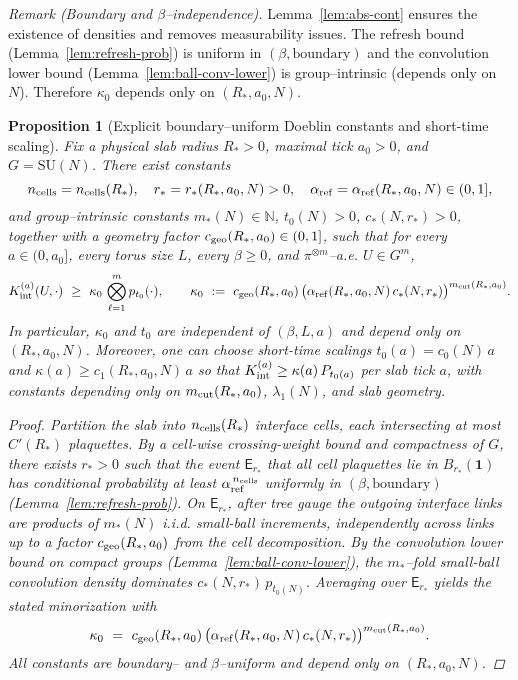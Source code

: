 \documentclass[11pt]{amsart}
\theoremstyle{plain}
\newtheorem{proposition}[theorem]{Proposition}
\theoremstyle{definition}
\theoremstyle{remark}
\begin{document}
\noindent\emph{Remark (Boundary and $\beta$–independence).} Lemma~\ref{lem:abs-cont} ensures the existence of densities and removes measurability issues. The refresh bound (Lemma~\ref{lem:refresh-prob}) is uniform in $(\beta,\text{boundary})$ and the convolution lower bound (Lemma~\ref{lem:ball-conv-lower}) is group–intrinsic (depends only on $N$). Therefore $\kappa_0$ depends only on $(R_*,a_0,N)$.

\begin{proposition}[Explicit boundary–uniform Doeblin constants and short-time scaling]\label{prop:explicit-doeblin-constants}
Fix a physical slab radius $R_*>0$, maximal tick $a_0>0$, and $G=\mathrm{SU}(N)$. There exist constants
\[
  n_{\rm cells}=n_{\rm cells}(R_*),\quad r_*=r_*(R_*,a_0,N)>0,\quad \alpha_{\rm ref}=\alpha_{\rm ref}(R_*,a_0,N)\in(0,1],
\]
and group–intrinsic constants $m_*(N)\in\mathbb N$, $t_0(N)>0$, $c_*(N,r_*)>0$, together with a geometry factor $c_{\rm geo}(R_*,a_0)\in(0,1]$, such that for every $a\in(0,a_0]$, every torus size $L$, every $\beta\ge 0$, and $\pi^{\otimes m}$–a.e. $U\in G^m$,
\[
  K_{\rm int}^{(a)}(U,\cdot)\ \ge\ \kappa_0\,\bigotimes_{\ell=1}^m p_{t_0}(\cdot),\qquad
  \kappa_0\ :=\ c_{\rm geo}(R_*,a_0)\,\big(\alpha_{\rm ref}(R_*,a_0,N)\,c_*(N,r_*)\big)^{m_{\rm cut}(R_*,a_0)}.
\]
In particular, $\kappa_0$ and $t_0$ are independent of $(\beta,L,a)$ and depend only on $(R_*,a_0,N)$. Moreover, one can choose short-time scalings $t_0(a)=c_0(N)\,a$ and $\kappa(a)\ge c_1(R_*,a_0,N)\,a$ so that $K_{\rm int}^{(a)}\ge \kappa(a)\,P_{t_0(a)}$ per slab tick $a$, with constants depending only on $m_{\rm cut}(R_*,a_0)$, $\lambda_1(N)$, and slab geometry.

\begin{proof}
Partition the slab into $n_{\rm cells}(R_*)$ interface cells, each intersecting at most $C'(R_*)$ plaquettes. By a cell-wise crossing-weight bound and compactness of $G$, there exists $r_*>0$ such that the event $\mathsf E_{r_*}$ that all cell plaquettes lie in $B_{r_*}(\mathbf 1)$ has conditional probability at least $\alpha_{\rm ref}^{\,n_{\rm cells}}$ uniformly in $(\beta,\text{boundary})$ (Lemma~\ref{lem:refresh-prob}). On $\mathsf E_{r_*}$, after tree gauge the outgoing interface links are products of $m_*(N)$ i.i.d. small-ball increments, independently across links up to a factor $c_{\rm geo}(R_*,a_0)$ from the cell decomposition. By the convolution lower bound on compact groups (Lemma~\ref{lem:ball-conv-lower}), the $m_*$–fold small-ball convolution density dominates $c_*(N,r_*)\,p_{t_0(N)}$. Averaging over $\mathsf E_{r_*}$ yields the stated minorization with
\[
  \kappa_0\ =\ c_{\rm geo}(R_*,a_0)\,\big(\alpha_{\rm ref}(R_*,a_0,N)\,c_*(N,r_*)\big)^{m_{\rm cut}(R_*,a_0)}.
\]
All constants are boundary– and $\beta$–uniform and depend only on $(R_*,a_0,N)$.
\end{proof}
\end{proposition}
\end{document}

